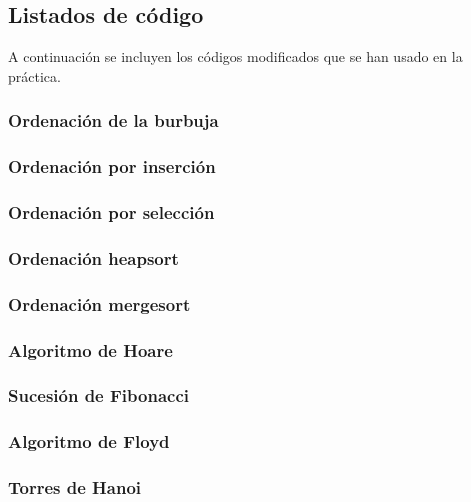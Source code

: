 \documentclass[a4paper, 11pt]{article} %
\newenvironment{allintypewriter}{\ttfamily}{\par}
\begin{document}
\begin{itemize}
\begin{itemize}
\subsection{Listados de código}
A continuación se incluyen los códigos modificados que se han usado en la práctica.
\scriptsize{
\begin{allintypewriter}

\subsubsection{Ordenación de la burbuja}


\subsubsection{Ordenación por inserción}


\subsubsection{Ordenación por selección}


\subsubsection{Ordenación heapsort}


\subsubsection{Ordenación mergesort}


\subsubsection{Algoritmo de Hoare}


\subsubsection{Sucesión de Fibonacci}


\subsubsection{Algoritmo de Floyd}


\subsubsection{Torres de Hanoi}



\end{allintypewriter}}
\end{itemize}
\end{itemize}
\end{document}
